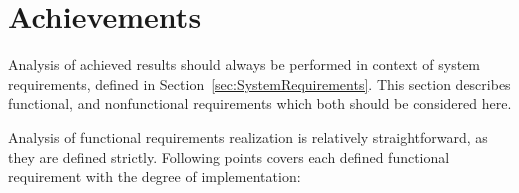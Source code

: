 %
\section{Achievements}
\label{sec:achievements}

Analysis of achieved results should always be performed in context of system requirements, defined in Section~\ref{sec:SystemRequirements}. This section describes functional, and nonfunctional requirements which both should be considered here. 

Analysis of functional requirements realization is relatively straightforward, as they are defined strictly. 
Following points covers each defined functional requirement with the degree of implementation:

